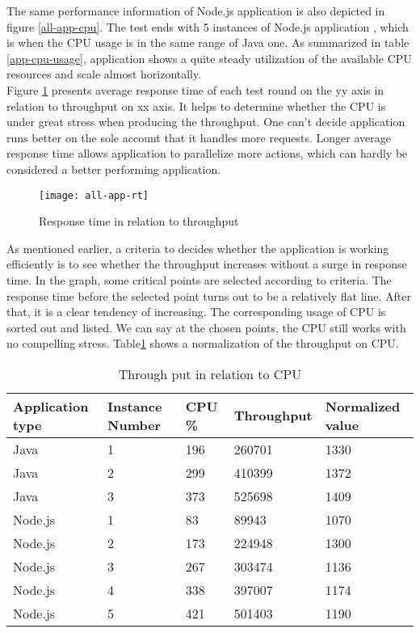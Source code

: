 The same performance information of Node.js application is also depicted in figure \ref{all-app-cpu}. The test ends with 5 instances of Node.js application , which is when the CPU usage is in the same range of Java one. As summarized in table \ref{app-cpu-usage}, application shows a quite steady utilization of the available CPU resources and scale almost horizontally. \\
Figure \ref{all-app-rt} presents average response time of each test round on the yy axis in relation to throughput on xx axis. It helps to determine whether the CPU is under great stress when producing the throughput. One can't decide application runs better on the sole account that it handles more requests. Longer average response time allows application to parallelize more actions, which can hardly be considered a better performing application. 
 \begin{figure}[h]
	\centering
	\texttt{[image: all-app-rt]}
	\caption{Response time in relation to throughput}
	\label{all-app-rt}
\end{figure}
As mentioned earlier, a criteria to decides whether the application is working efficiently is to see whether the throughput increases without a surge in response time. In the graph, some critical points are selected according to criteria. The response time before the selected point turns out to be a relatively flat line. After that, it is a clear tendency of increasing. The corresponding usage of CPU is sorted out and listed. We can say at the chosen points, the CPU still works with no compelling stress. Table\ref{app-cpu-normalized} shows a normalization of the throughput on CPU.
\begin{table}[h]
	\caption{Through put in relation to CPU}
	\label{app-cpu-normalized}
	\renewcommand{\arraystretch}{1.2}
	\centering
	\sffamily
	\begin{footnotesize}
		\begin{tabular}{l l l l l  }
			\toprule
			\textbf{Application  type} &\textbf{Instance Number} & \textbf{CPU \%} & \textbf{Throughput}& \textbf{Normalized value} }\\
		\midrule
		Java &1 	&	196	 & 260701 & 1330\\
		Java &2	&	299 & 410399& 1372\\
		Java &3	&	373  &	525698 & 1409\\
		\midrule
		Node.js &1 	&	83	 & 89943 & 1070\\
		Node.js &2	&	173 &  224948&1300\\
		Node.js &3	&	267 & 303474 & 1136\\
		Node.js &4	&	338 & 397007 &1174\\
		Node.js &5	&	421 & 501403 & 1190\\
		\bottomrule
	\end{tabular}
\end{footnotesize}
\rmfamily
\end{table}

